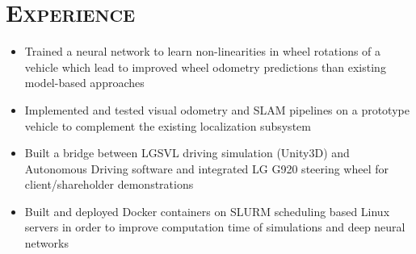\documentclass[11pt,a4paper,roman]{moderncv} %
\begin{document}
\vspace{20pt}
\section{\scshape{\huge Experience}}
\vspace{10pt}
{
\begin{itemize}
\item Trained a neural network to learn non-linearities in wheel rotations of a vehicle which lead to improved wheel odometry predictions than 
existing model-based approaches
\item Implemented and tested visual odometry and SLAM pipelines on a prototype vehicle to complement the existing localization subsystem
\item Built a bridge between LGSVL driving simulation (Unity3D) and Autonomous Driving software and integrated LG G920 steering wheel 
for client/shareholder demonstrations
\item Built and deployed Docker containers on SLURM scheduling based Linux servers in order to improve computation time of simulations and deep neural networks
\end{itemize}
}

\vspace{10pt}
\end{document}
